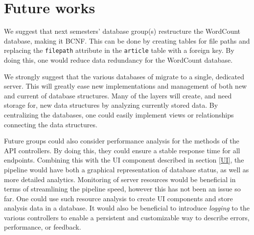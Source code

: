 \section{Future works}
We suggest that next semesters' database group(s) restructure the WordCount database, making it BCNF. 
This can be done by creating tables for file paths and replacing the \texttt{filepath} attribute in the \texttt{article} table with a foreign key.
By doing this, one would reduce data redundancy for the WordCount database. 

We strongly suggest that the various databases of \knox{} migrate to a single, dedicated server.
This will greatly ease new implementations and management of both new and current of database structures.
Many of the layers will create, and need storage for, new data structures by analyzing currently stored data.
By centralizing the \knox{} databases, one could easily implement views or relationships connecting the data structures.

Future groups could also consider performance analysis for the methods of the API controllers. 
By doing this, they could ensure a stable response time for all endpoints.
Combining this with the UI component described in section \ref{UI}, the pipeline would have both a graphical representation of database status, as well as more detailed analytics.
Monitoring of server resources would be beneficial in terms of streamlining the pipeline speed, however this has not been an issue so far.
One could use such resource analysis to create UI components and store analysis data in a database. 
It would also be beneficial to introduce \textit{logging}\cite{ASPLogging} to the various controllers to enable a persistent and customizable way to describe errors, performance, or feedback.
